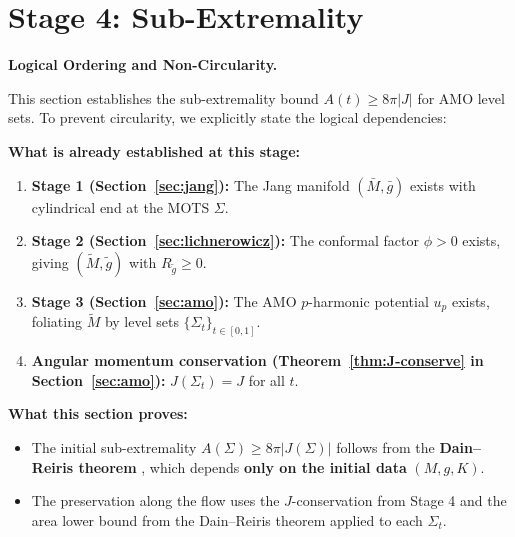\section{Stage 4: Sub-Extremality}\label{sec:subextremality}

\textbf{Logical Ordering and Non-Circularity.}

This section establishes the sub-extremality bound $A(t) \geq 8\pi|J|$ for AMO level sets. To prevent circularity, we explicitly state the logical dependencies:

\textbf{What is already established at this stage:}
\begin{enumerate}[label=(\arabic*)]
    \item \textbf{Stage 1 (Section~\ref{sec:jang}):} The Jang manifold $(\bar{M}, \bar{g})$ exists with cylindrical end at the MOTS $\Sigma$.
    \item \textbf{Stage 2 (Section~\ref{sec:lichnerowicz}):} The conformal factor $\phi > 0$ exists, giving $(\tilde{M}, \tilde{g})$ with $R_{\tilde{g}} \geq 0$.
    \item \textbf{Stage 3 (Section~\ref{sec:amo}):} The AMO $p$-harmonic potential $u_p$ exists, foliating $\tilde{M}$ by level sets $\{\Sigma_t\}_{t \in [0,1]}$.
    \item \textbf{Angular momentum conservation (Theorem~\ref{thm:J-conserve} in Section~\ref{sec:amo}):} $J(\Sigma_t) = J$ for all $t$.
\end{enumerate}

\textbf{What this section proves:}
\begin{itemize}
    \item The initial sub-extremality $A(\Sigma) \geq 8\pi|J(\Sigma)|$ follows from the \textbf{Dain--Reiris theorem} \cite{dain2011}, which depends \textbf{only on the initial data} $(M, g, K)$.
    \item The preservation along the flow uses the $J$-conservation from Stage 4 and the area lower bound from the Dain--Reiris theorem applied to each $\Sigma_t$.
\end{itemize}

